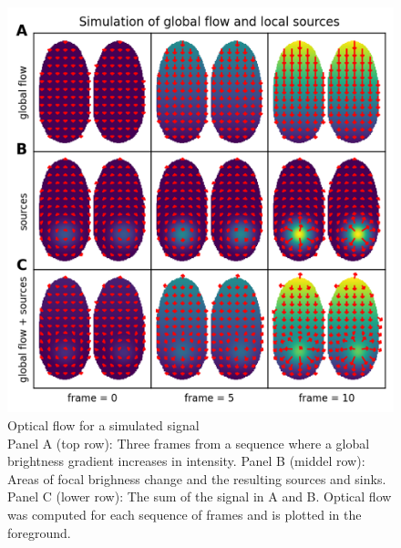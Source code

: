 \begin{figure}[!htb]
\centering
\includegraphics[width=\textwidth,height=\textheight,keepaspectratio]{Figures/optical_flow_for_a_simulated_signal}
\decoRule
\caption[Optical flow for a simulated signal]{Optical flow for a simulated signal\\ Panel A (top row): Three frames from a sequence where a global brightness gradient increases in intensity. Panel B (middel row): Areas of focal brighness change and the resulting sources and sinks. Panel C (lower row): The sum of the signal in A and B. Optical flow was computed for each sequence of frames and is plotted in the foreground.}
\label{fig:optical_flow_for_a_simulated_signal}
\end{figure}
